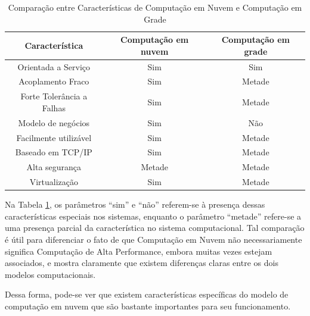 \documentclass[
	12pt,				%
	oneside,			%
	a4paper,			%
	chapter=TITLE,		%
	english,			%
	french,				%
	spanish,			%
	brazil				%
	]{abntex2}
\begin{document}
\begin{table}[H]
    \ABNTEXchapterfont
    \centering
    \caption{Comparação entre Características de Computação em Nuvem e Computação em Grade}
    \begin{tabular}{|c|c|c|}
    \hline
        \textbf{Característica} & \textbf{Computação em nuvem}  & \textbf{Computação em grade}\\
        \hline
        \hline
        Orientada a Serviço & Sim  & Sim\\
        \hline
        Acoplamento Fraco & Sim  & Metade\\
        \hline
        Forte Tolerância a Falhas & Sim  & Metade\\
        \hline
        Modelo de negócios & Sim  & Não\\
        \hline
        Facilmente utilizável & Sim  & Metade \\
        \hline
        Baseado em TCP/IP & Sim & Metade\\
        \hline
        Alta segurança & Metade  & Metade\\
        \hline
        Virtualização & Sim  & Metade\\
    \hline
    \end{tabular}
    \label{tab:comparacao}
\end{table}

Na Tabela \ref{tab:comparacao}, os parâmetros ``sim'' e ``não'' referem-se à presença dessas características especiais nos sistemas, enquanto o parâmetro ``metade'' refere-se a uma presença parcial da característica no sistema computacional. Tal comparação é útil para diferenciar o fato de que Computação em Nuvem não necessariamente significa Computação de Alta Performance, embora muitas vezes estejam associados, e mostra claramente que existem diferenças claras entre os dois modelos computacionais.

Dessa forma, pode-se ver que existem características específicas do modelo de computação em nuvem que são bastante importantes para seu funcionamento.
\end{document}

